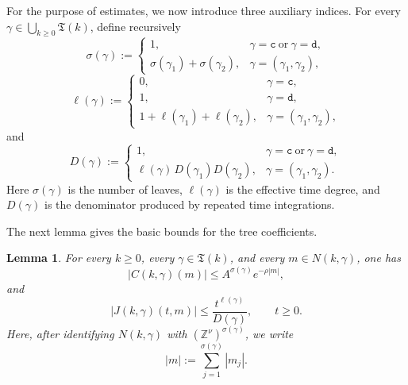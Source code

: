 \documentclass[12pt,reqno,tbtags]{amsart}
\newtheorem{lemma}{Lemma}[section]
\newcommand\1{\mathbbm{1}}
\begin{document}
For the purpose of estimates, we now introduce three auxiliary indices. For every
$\gamma\in \bigcup_{k\geq 0}\mathfrak{T}(k)$, define recursively
\begin{equation*}
\sigma(\gamma):=
\begin{cases}
1, & \gamma=\mathtt{c}\ \text{or}\ \gamma=\mathtt{d},\\[1mm]
\sigma(\gamma_1)+\sigma(\gamma_2), & \gamma=(\gamma_1,\gamma_2),
\end{cases}
\end{equation*}
\begin{equation*}
\ell(\gamma):=
\begin{cases}
0, & \gamma=\mathtt{c},\\[1mm]
1, & \gamma=\mathtt{d},\\[1mm]
1+\ell(\gamma_1)+\ell(\gamma_2), & \gamma=(\gamma_1,\gamma_2),
\end{cases}
\end{equation*}
and
\begin{equation*}
D(\gamma):=
\begin{cases}
1, & \gamma=\mathtt{c}\ \text{or}\ \gamma=\mathtt{d},\\[1mm]
\ell(\gamma)\,D(\gamma_1)D(\gamma_2), & \gamma=(\gamma_1,\gamma_2).
\end{cases}
\end{equation*}
Here $\sigma(\gamma)$ is the number of leaves, $\ell(\gamma)$ is the effective time
degree, and $D(\gamma)$ is the denominator produced by repeated time integrations.

The next lemma gives the basic bounds for the tree coefficients.

\begin{lemma}\label{lem:CJ-estimates}
For every $k\geq 0$, every $\gamma\in \mathfrak{T}(k)$, and every $m\in N(k,\gamma)$,
one has
\begin{equation}\label{eq:C-bound}
|C(k,\gamma)(m)|\leq A^{\sigma(\gamma)} e^{-\rho |m|},
\end{equation}
and
\begin{equation}\label{eq:J-bound}
|J(k,\gamma)(t,m)|\leq \frac{t^{\ell(\gamma)}}{D(\gamma)},
\qquad t\geq 0.
\end{equation}
Here, after identifying $N(k,\gamma)$ with $(\mathbb{Z}^{\nu})^{\sigma(\gamma)}$, we write
\[
|m|:=\sum_{j=1}^{\sigma(\gamma)} |m_j|.
\]
\end{lemma}
\end{document}
